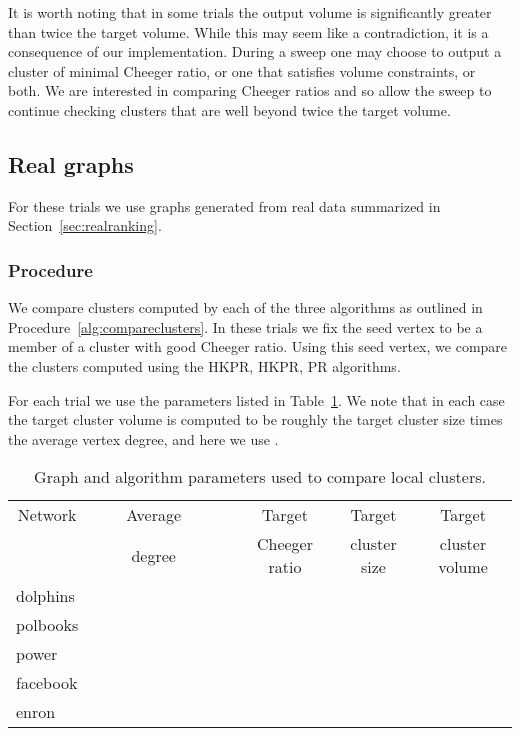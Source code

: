\documentclass[runningheads,a4paper]{llncs}
\begin{document}
It is worth noting that in some trials the output volume is significantly
greater than twice the target volume.  While this may seem like a contradiction,
it is a consequence of our implementation.  During a sweep one may choose to
output a cluster of minimal Cheeger ratio, or one that satisfies volume
constraints, or both.  We are interested in comparing Cheeger ratios and so
allow the sweep to continue checking clusters that are well beyond twice the
target volume.

\subsection{Real graphs}
For these trials we use graphs generated from real data summarized in
Section~\ref{sec:realranking}.

\subsubsection{Procedure} We compare clusters computed by each of the three
algorithms as outlined in Procedure~\ref{alg:compareclusters}.  In these trials
we fix the seed vertex to be a member of a cluster with good Cheeger ratio.
Using this seed vertex, we compare the clusters computed using the
HKPR, HKPR, PR algorithms.

For each trial we use the parameters listed in Table~\ref{table:clusterparams}.
We note that in each case the target cluster volume is computed to be roughly
the target cluster size times the average vertex degree, and here we use
.  
\begin{table}
\centering
\begin{tabular}{|p{2cm}|c|c|c|c|c|c|c|}
\hline
\multicolumn{1}{|c|}{Network} &  &  & Average & ~~~~ & Target & Target & Target\\
        &       &       & degree  &                & Cheeger ratio & cluster size & cluster volume\\
\hline
dolphins  &     &     &     &  &  &   &   \\
polbooks  &    &     &   &  &  &   &   \\
power     &   &    &   &  &  &  &   \\
facebook  &   &   &  &  &  &  &  \\
enron     &  &  &    &  &  &  &  \\
\hline
\end{tabular}
\caption{Graph and algorithm parameters used to compare local clusters.}
\label{table:clusterparams} 
\end{table}
\end{document}
